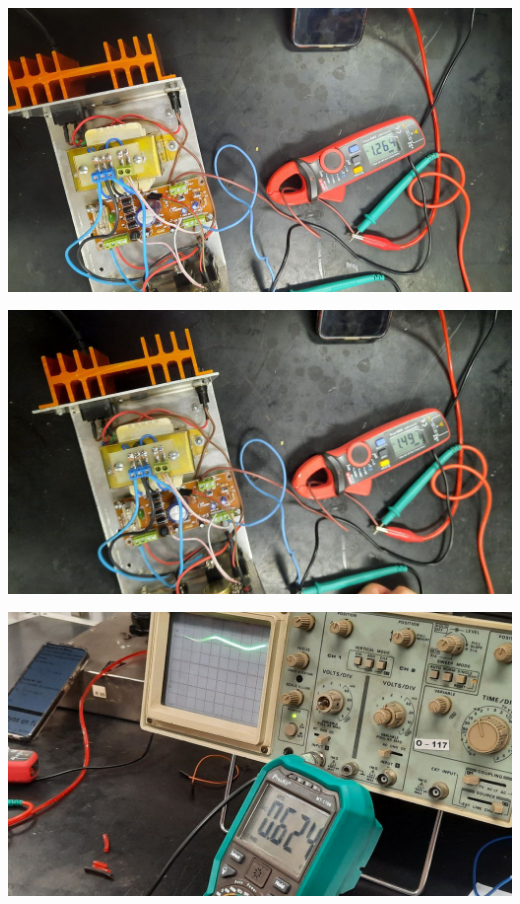 \saltoPag{}

\begin{center}
    \centering
    \includegraphics[width=0.9\linewidth]{./imagenes/corriente_baja_1,25.jpg}
\end{center}

\begin{center}
    \centering
    \includegraphics[width=0.9\linewidth]{./imagenes/corriente_baja_1,5.jpg}
\end{center}

\begin{center}
    \centering
    \includegraphics[width=0.9\linewidth]{./imagenes/riplle_baja_osc_mult.jpg}
\end{center}

